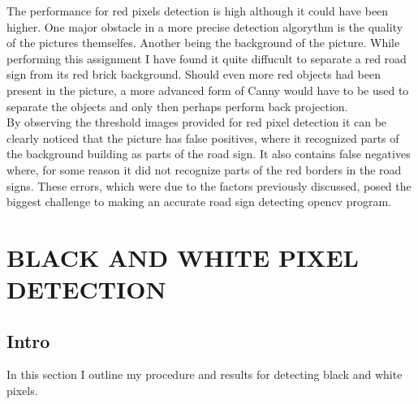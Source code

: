 \documentclass{article}
\begin{document}
The performance for red pixels detection is high although it could have been higher. One major obstacle in a more precise detection algorythm is the quality of the pictures themselfes. Another being the background of the picture. While performing this assignment I have found it quite diffucult to separate a red road sign from its red brick background. Should even more red objects had been present in the picture, a more advanced form of Canny would have to be used to separate the objects and only then perhaps perform back projection.\\


By observing the threshold images provided for red pixel detection it can be clearly noticed that the picture has false positives, where it recognized parts of the background building as parts of the road sign. It also contains false negatives where, for some reason it did not recognize parts of the red borders in the road signs. These errors, which were due to the factors previously discussed, posed the biggest challenge to making an accurate road sign detecting opencv program.\\



\pagebreak
\section{BLACK AND WHITE PIXEL DETECTION}
\subsection{Intro}\label{sec:intro}
In this section I outline my procedure and results for detecting black and white pixels.\\
\end{document}
